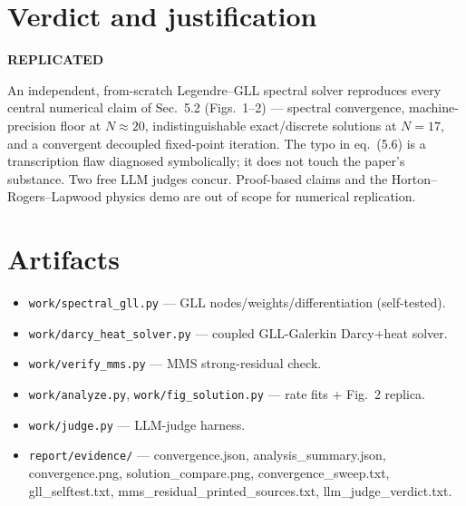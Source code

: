 \documentclass[11pt]{article}
\begin{document}
\section{Verdict and justification}
\label{sec:verdict}
\begin{center}\Large\textbf{REPLICATED}\end{center}
\noindent An independent, from-scratch Legendre--GLL spectral solver reproduces every central
numerical claim of Sec.~5.2 (Figs.~1--2) --- spectral convergence, machine-precision floor at
$N\!\approx\!20$, indistinguishable exact/discrete solutions at $N=17$, and a convergent decoupled
fixed-point iteration. The typo in eq.~(5.6) is a transcription flaw diagnosed symbolically; it
does not touch the paper's substance. Two free LLM judges concur. Proof-based claims and the
Horton--Rogers--Lapwood physics demo are out of scope for numerical replication.

\section{Artifacts}
\label{sec:files}
\begin{itemize}
  \item \texttt{work/spectral\_gll.py} --- GLL nodes/weights/differentiation (self-tested).
  \item \texttt{work/darcy\_heat\_solver.py} --- coupled GLL-Galerkin Darcy+heat solver.
  \item \texttt{work/verify\_mms.py} --- MMS strong-residual check.
  \item \texttt{work/analyze.py}, \texttt{work/fig\_solution.py} --- rate fits + Fig.~2 replica.
  \item \texttt{work/judge.py} --- LLM-judge harness.
  \item \texttt{report/evidence/} --- convergence.json, analysis\_summary.json, convergence.png,
        solution\_compare.png, convergence\_sweep.txt, gll\_selftest.txt,
        mms\_residual\_printed\_sources.txt, llm\_judge\_verdict.txt.
\end{itemize}
\end{document}
